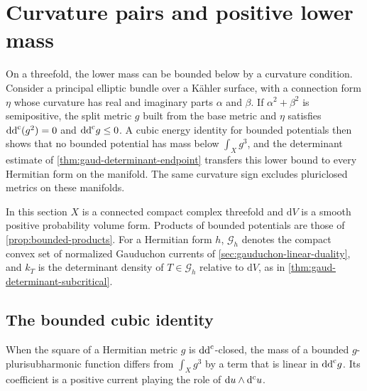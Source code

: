 \section{Curvature pairs and positive lower mass}
\label{sec:elliptic-curvature-endpoints}

On a threefold, the lower mass can be bounded below by a curvature condition. Consider a principal elliptic bundle over a K\"ahler surface, with a connection form $\eta$ whose curvature has real and imaginary parts $\alpha$ and $\beta$. If $\alpha^2+\beta^2$ is semipositive, the split metric $g$ built from the base metric and $\eta$ satisfies $\mathrm{dd}^{\mathrm{c}}(g^2)=0$ and $\mathrm{dd}^{\mathrm{c}} g\leq0$. A cubic energy identity for bounded potentials then shows that no bounded potential has mass below $\int_Xg^3$, and the determinant estimate of \cref{thm:gaud-determinant-endpoint} transfers this lower bound to every Hermitian form on the manifold. The same curvature sign excludes pluriclosed metrics on these manifolds.

In this section $X$ is a connected compact complex threefold and $\mathrm dV$ is a smooth positive probability volume form. Products of bounded potentials are those of \cref{prop:bounded-products}. For a Hermitian form $h$, $\mathscr G_h$ denotes the compact convex set of normalized Gauduchon currents of \cref{sec:gauduchon-linear-duality}, and $k_T$ is the determinant density of $T\in\mathscr G_h$ relative to $\mathrm dV$, as in \cref{thm:gaud-determinant-subcritical}.

\subsection{The bounded cubic identity}

When the square of a Hermitian metric $g$ is $\mathrm{dd}^{\mathrm{c}}$-closed, the mass of a bounded $g$-plurisubharmonic function differs from $\int_Xg^3$ by a term that is linear in $\mathrm{dd}^{\mathrm{c}} g$. Its coefficient is a positive current playing the role of $\mathrm du\wedge\mathrm d^{\mathrm c} u$.

